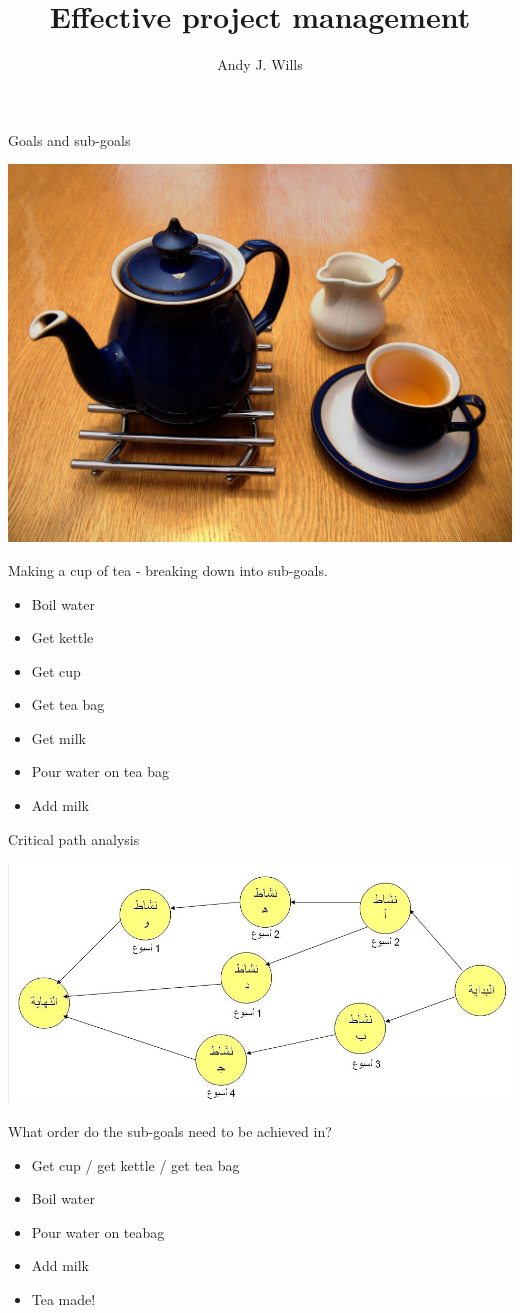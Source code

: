 \documentclass{beamer}
\title[Project management]{Effective project management }
\author{Andy J. Wills}
\date{}
\begin{document}

\frame{\titlepage}


\begin{frame}{Goals and sub-goals}
  \centerline{
  \includegraphics[width=.3\textwidth]{pics/Nice_Cup_of_Black_Tea.jpg}
}
  Making a cup of tea - breaking down into sub-goals.
  \begin{itemize}
    \item Boil water
 \item Get kettle
 \item Get cup
 \item Get tea bag
 \item Get milk
 \item Pour water on tea bag
 \item Add milk
  \end{itemize}
\end{frame}

\begin{frame}{Critical path analysis}
    \centerline{
  \includegraphics[width=.8\textwidth]{pics/Critical_path_diagram.JPG}
}
  What order do the sub-goals need to be achieved in?
  \begin{itemize}
    \item Get cup / get kettle / get tea bag
 \item Boil water
 \item Pour water on teabag
 \item Add milk
 \item Tea made!
  \end{itemize}
\end{frame}
\end{document}
